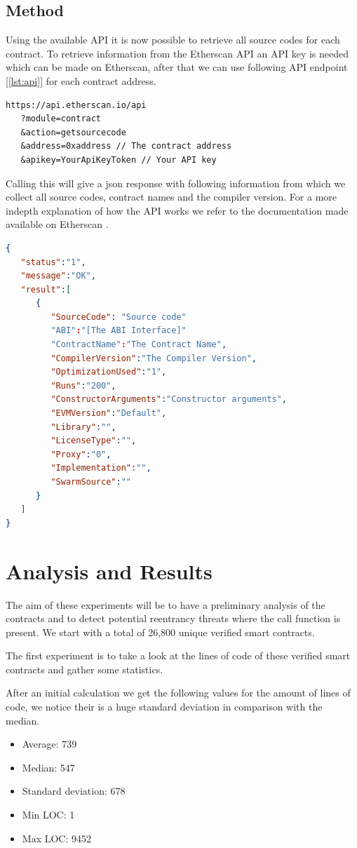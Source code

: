 \documentclass[10pt,conference]{IEEEtran}
\begin{document}
\subsection{Method}
Using the available API it is now possible to retrieve all source codes for each contract. To retrieve information from the Etherscan API an API key is needed which can be made on Etherscan, after that we can use following API endpoint  [\ref{lst:api}] for each contract address. 

\begin{lstlisting}[language=Solidity, caption=Api call, label={lst:api}]
https://api.etherscan.io/api
   ?module=contract
   &action=getsourcecode
   &address=0xaddress // The contract address
   &apikey=YourApiKeyToken // Your API key
\end{lstlisting}

Calling this will give a json response with following information from which
we collect all source codes, contract names and the compiler version. For a more indepth explanation of how the API works we refer to the documentation made available on Etherscan \cite{etherscan_api}. 
\begin{lstlisting}[language=json,firstnumber=1]
{
   "status":"1",
   "message":"OK",
   "result":[
      {
         "SourceCode": "Source code"
         "ABI":"[The ABI Interface]"
         "ContractName":"The Contract Name",
         "CompilerVersion":"The Compiler Version",
         "OptimizationUsed":"1",
         "Runs":"200",
         "ConstructorArguments":"Constructor arguments",
         "EVMVersion":"Default",
         "Library":"",
         "LicenseType":"",
         "Proxy":"0",
         "Implementation":"",
         "SwarmSource":""
      }
   ]
}
\end{lstlisting}

\section{Analysis and Results}

The aim of these experiments will be to have a preliminary analysis of the contracts and to detect potential reentrancy threats where the call function is present. We start with a total of 26,800 unique verified smart contracts. 



The first experiment is to take a look at the lines of code of these verified smart contracts and gather some statistics.

After an initial calculation we get the following values for the amount of lines of code, we notice their is a huge standard deviation in comparison with the median.
\begin{itemize}
    \item Average: 739
    \item Median: 547
    \item Standard deviation: 678
    \item Min LOC: 1
    \item Max LOC: 9452
\end{itemize}
\end{document}
